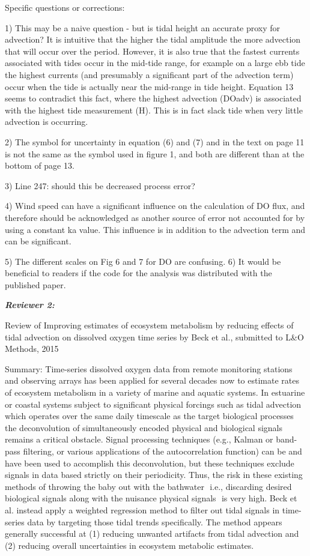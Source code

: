 \documentclass[letterpaper,12pt]{article}\usepackage[]{graphicx}\usepackage[]{color}
\newcommand{\Bigtxt}[1]{\textbf{\textit{#1}}}
\begin{document}
Specific questions or corrections:

1) This may be a naive question -  but is tidal height an accurate proxy for advection? It is intuitive that the higher the tidal amplitude the more advection that will occur over the period. However, it is also true that the fastest currents associated with tides occur in the mid-tide range, for example on a large ebb tide the highest currents (and presumably a significant part of the advection term) occur when the tide is actually near the mid-range in tide height. Equation 13 seems to contradict this fact, where the highest advection (DOadv) is associated with the highest tide measurement (H). This is in fact slack tide when very little advection is occurring.


2) The symbol for uncertainty in equation (6) and (7) and in the text on page 11 is not the same as the symbol used in figure 1, and both are different than at the bottom of page 13.

3) Line 247: should this be decreased process error?

4) Wind speed can have a significant influence on the calculation of DO flux, and therefore should be acknowledged as another source of error not accounted for by using a constant ka value. This influence is in addition to the advection term and can be significant.

5) The different scales on Fig 6 and 7 for DO are confusing. 
6) It would be beneficial to readers if the code for the analysis was distributed with the published paper.


\Bigtxt{Reviewer 2:}

Review of Improving estimates of ecosystem metabolism by reducing effects of tidal advection on dissolved oxygen time series by Beck et al., submitted to L\&O Methods, 2015

Summary: Time-series dissolved oxygen data from remote monitoring stations and observing arrays has been applied for several decades now to estimate rates of ecosystem metabolism in a variety of marine and aquatic systems. In estuarine or coastal systems subject to significant physical forcings such as tidal advection  which operates over the same daily timescale as the target biological processes  the deconvolution of simultaneously encoded physical and biological signals remains a critical obstacle. Signal processing techniques (e.g., Kalman or
band-pass filtering, or various applications of the autocorrelation function) can be and have been used to accomplish this deconvolution, but these techniques exclude signals in data based strictly on their periodicity. Thus, the risk in these existing methods of throwing the baby out with the bathwater  i.e., discarding desired biological signals along with the nuisance physical signals  is very high. Beck et al. instead apply a weighted regression method to filter out tidal signals in time-series data by targeting those tidal trends specifically. The method appears generally successful at (1) reducing unwanted artifacts from tidal advection and (2) reducing overall uncertainties in ecosystem metabolic estimates.
\end{document}

